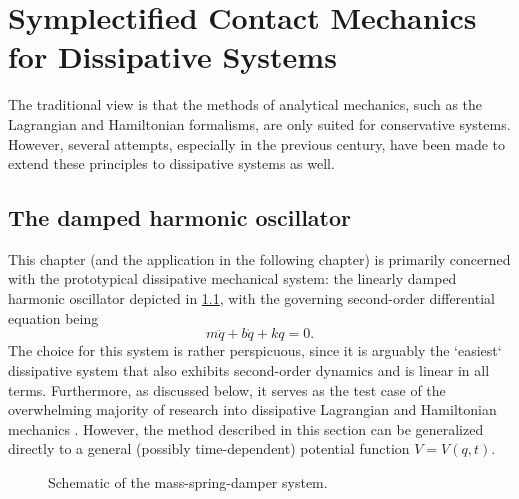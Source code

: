 \chapter{Symplectified Contact Mechanics for Dissipative Systems}

The traditional view is that the methods of analytical mechanics, such as the Lagrangian and Hamiltonian formalisms, are
only suited for conservative systems. However, several attempts, especially in the previous century, have been made to
extend these principles to dissipative systems as well. 

\section{The damped harmonic oscillator}
This chapter (and the application in the following chapter) is
primarily concerned with the prototypical dissipative mechanical system: the linearly damped harmonic oscillator
depicted in \cref{fig:dho}, with the governing second-order differential equation being
\begin{equation}  
  m\ddot{q} + b\dot{q} + kq = 0.
\end{equation}
The choice for this system is rather perspicuous, since it is arguably the `easiest` dissipative system that also
exhibits second-order dynamics and is linear in all terms. Furthermore, as discussed below, it serves as the test case
of the overwhelming majority of research into dissipative Lagrangian and Hamiltonian mechanics
\cite{Dekker1981,Hutters2020b}. However, the method described in this section can be generalized directly to a general
(possibly time-dependent) potential function $V = V(q, t)$.
\begin{figure}
    \begin{center}
        
    \end{center}
    \caption{Schematic of the mass-spring-damper system.}
    \label{fig:dho}
\end{figure}

